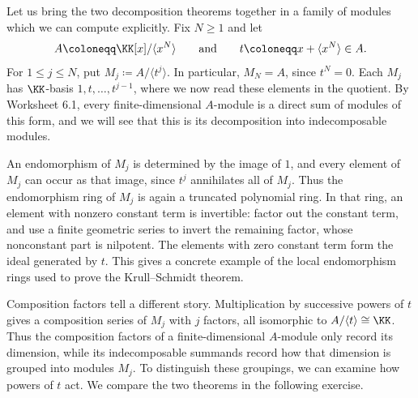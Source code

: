 \documentclass[12pt,reqno]{amsart}
\begin{document}
\hrulefill

Let us bring the two decomposition theorems together in a family of modules which we can compute explicitly. Fix $N\geq1$ and let
\[
A\coloneqq\KK[x]/\langle x^N\rangle\qquad\text{and}\qquad t\coloneqq x+\langle x^N\rangle\in A.
\]
For $1\leq j\leq N$, put $M_j\coloneqq A/\langle t^j\rangle$.
In particular, $M_N=A$, since $t^N=0$. Each $M_j$ has $\KK$-basis $1,t,\ldots,t^{j-1}$, where we now read these elements in the quotient. By Worksheet 6.1, every finite-dimensional $A$-module is a direct sum of modules of this form, and we will see that this is its decomposition into indecomposable modules.

An endomorphism of $M_j$ is determined by the image of $1$, and every element of $M_j$ can occur as that image, since $t^j$ annihilates all of $M_j$. Thus the endomorphism ring of $M_j$ is again a truncated polynomial ring. In that ring, an element with nonzero constant term is invertible: factor out the constant term, and use a finite geometric series to invert the remaining factor, whose nonconstant part is nilpotent. The elements with zero constant term form the ideal generated by $t$. This gives a concrete example of the local endomorphism rings used to prove the Krull--Schmidt theorem.

Composition factors tell a different story. Multiplication by successive powers of $t$ gives a composition series of $M_j$ with $j$ factors, all isomorphic to $A/\langle t\rangle\cong\KK$. Thus the composition factors of a finite-dimensional $A$-module only record its dimension, while its indecomposable summands record how that dimension is grouped into modules $M_j$. To distinguish these groupings, we can examine how powers of $t$ act. We compare the two theorems in the following exercise.

\hrulefill
\end{document}
